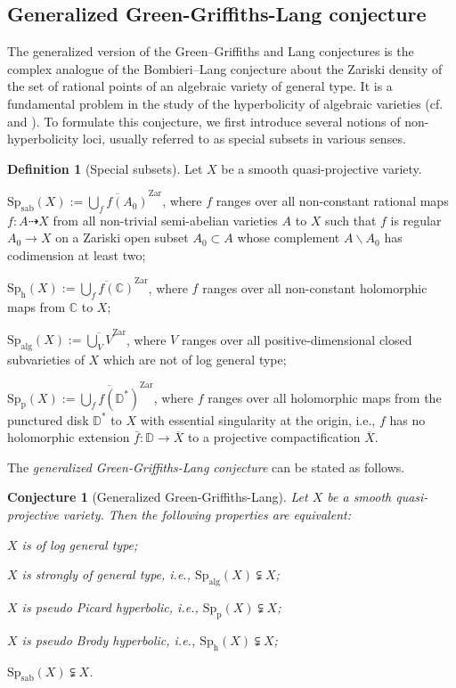 \documentclass[11pt,english]{smfart}
\theoremstyle{plain}
\newtheorem{conjecture}[thm]{Conjecture}
\theoremstyle{definition}
\newtheorem{dfn}[thm]{Definition}
\theoremstyle{remark}
\numberwithin{equation}{section}
\theoremstyle{plain}
\newcommand{\bD}{\mathbb{D}}
\newcommand{\Spab}{\mathrm{Sp}_{\mathrm{sab}}}
\newcommand{\Sph}{\mathrm{Sp}_{\mathrm{h}}}
\newcommand{\Spp}{\mathrm{Sp}_{\mathrm{p}}}
\newcommand{\Spalg}{\mathrm{Sp}_{\mathrm{alg}}}
\begin{document}
\subsection{Generalized Green-Griffiths-Lang conjecture}
The generalized version of the Green–Griffiths and Lang conjectures is the complex analogue of the Bombieri–Lang conjecture about the Zariski density of the set of rational points of an algebraic variety of general type.  It is a fundamental problem in the study of the hyperbolicity of algebraic varieties (cf. \cite[I, 3.5]{Lan97} and \cite[VIII, Conj. 1.3]{Lan97}). To formulate this conjecture, we first introduce several notions of non-hyperbolicity loci, usually referred to as special subsets in various senses.
\begin{dfn}[Special subsets] \label{def:special2}
	Let $X$ be a smooth quasi-projective variety.
	\begin{thmlist}
		\item $\Spab(X) := \overline{\bigcup_{f}f(A_0)}^{\mathrm{Zar}}$, where $f$ ranges over all non-constant rational maps $f:A\dashrightarrow X$ from all non-trivial semi-abelian varieties $A$ to $X$ such that $f$ is regular $A_0\to X$ on a Zariski open subset $A_0\subset A$ whose complement $A\backslash A_0$ has codimension at least two;
		\item $\Sph(X) := \overline{\bigcup_{f}f(\mathbb{C})}^{\mathrm{Zar}}$, where $f$ ranges over all non-constant holomorphic maps from $\mathbb{C}$ to $X$;
		\item $\Spalg(X) := \overline{\bigcup_{V} V}^{\mathrm{Zar}}$, where $V$ ranges over all positive-dimensional closed subvarieties of $X$ which are not of log general type;
		\item $\Spp(X) := \overline{\bigcup_{f}f(\bD^*)}^{\mathrm{Zar}}$, where $f$ ranges over all holomorphic maps from the punctured disk $\bD^*$ to $X$ with essential singularity at the origin, i.e., $f$ has no holomorphic extension $\bar{f}:\mathbb D\to\overline{X}$ to a projective compactification $\overline{X}$.
	\end{thmlist}
\end{dfn}
The \emph{generalized  Green-Griffiths-Lang conjecture} can be stated as follows.  
\begin{conjecture}[Generalized  Green-Griffiths-Lang]\label{conj:GGL}
	Let $X$ be a smooth quasi-projective variety.  Then the following properties are equivalent:
	\begin{thmlist} 
		\item  $X$ is of log general type; 
		\item  $X$ is \emph{strongly of general type},  i.e.,
		$\Spalg(X)\subsetneqq X$;
		\item  $X$ is \emph{pseudo Picard hyperbolic},  i.e., $\Spp(X)\subsetneqq X$; 
		\item  $X$ is \emph{pseudo Brody hyperbolic},  i.e., $\Sph(X)\subsetneqq X$; 
		\item  
		$\Spab(X)\subsetneqq X$. 
	\end{thmlist}
\end{conjecture} 
\end{document}
